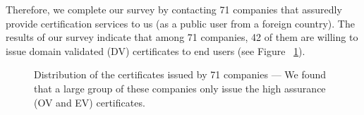 Therefore, we complete our survey by contacting 71 companies that assuredly provide certification services to us (as a public user from a foreign country). The results of our survey indicate that among 71 companies, 42 of them are willing to issue domain validated (DV) certificates to end users (see Figure ~\ref{fig:VennDiagram}). 

\begin{figure}
\begin{center}
\end{center}
\caption[Distribution of the certificates issued by 71 companies]{Distribution of the certificates issued by 71 companies --- We found that a large group of these companies only issue the high assurance (OV and EV) certificates.}
\label{fig:VennDiagram}
\end{figure}

